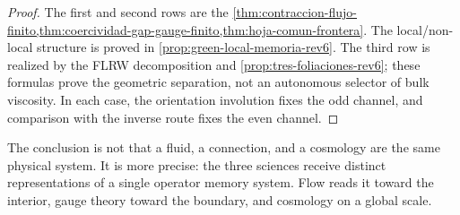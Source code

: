 \begin{proof}
The first and second rows are the
\cref{thm:contraccion-flujo-finito,thm:coercividad-gap-gauge-finito,thm:hoja-comun-frontera}.
The local/non-local structure is proved in
\cref{prop:green-local-memoria-rev6}. The third row is realized by the
FLRW decomposition and \cref{prop:tres-foliaciones-rev6}; these formulas
prove the geometric separation, not an autonomous selector of bulk
viscosity. In each case, the orientation involution fixes the odd channel, and
comparison with the inverse route fixes the even channel.
\end{proof}

The conclusion is not that a fluid, a connection, and a cosmology are the
same physical system. It is more precise: the three sciences receive
distinct representations of a single operator memory system. Flow reads it
toward the interior, gauge theory toward the boundary, and cosmology on a
global scale.
